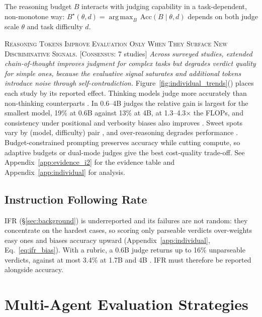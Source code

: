 \documentclass[11pt]{article}
\DeclareMathOperator*{\argmax}{arg\,max}
\begin{document}
The reasoning budget $B$ interacts with judging capability in a task-dependent, non-monotone way: $B^\star(\theta,d) = \argmax_{B}\,\mathrm{Acc}(B\mid\theta,d)$ depends on both judge scale $\theta$ and task difficulty $d$.

\textsc{Reasoning Tokens Improve Evaluation Only When They Surface New Discriminative Signals.} [\textsc{Consensus}: 7 studies] \textit{Across surveyed studies, extended chain-of-thought \citep{wei2022chain} improves judgment for complex tasks but degrades verdict quality for simple ones, because the evaluative signal saturates and additional tokens introduce noise through self-contradiction.} Figure~\ref{fig:individual_trends}() places each study by its reported effect. Thinking models judge more accurately than non-thinking counterparts \citep{jayarao2025explicit, jiang2025codejudgebench}. In 0.6--4B judges the relative gain is largest for the smallest model, 19\% at 0.6B against 13\% at 4B, at 1.3--4.3$\times$ the FLOPs, and consistency under positional and verbosity biases also improves \citep{jayarao2025explicit}. Sweet spots vary by (model, difficulty) pair \citep{aggarwal2025optimalthinkingbench}, and over-reasoning degrades performance \citep{sui2025stop, shojaee2026illusion}. Budget-constrained prompting \citep{han2025token} preserves accuracy while cutting compute, so adaptive budgets or dual-mode judges give the best cost-quality trade-off. See Appendix~\ref{app:evidence_i2} for the evidence table and Appendix~\ref{app:individual} for analysis.

\subsection{Instruction Following Rate}
\label{sec:ifr}

IFR (\S\ref{sec:background}) is underreported and its failures are not random: they concentrate on the hardest cases, so scoring only parseable verdicts over-weights easy ones and biases accuracy upward (Appendix~\ref{app:individual}, Eq.~\ref{eq:ifr_bias}). With a rubric, a 0.6B judge returns up to 16\% unparseable verdicts, against at most 3.4\% at 1.7B and 4B \citep{jayarao2025explicit}. IFR must therefore be reported alongside accuracy.

\section{Multi-Agent Evaluation Strategies}
\label{sec:multiagent}
\end{document}
